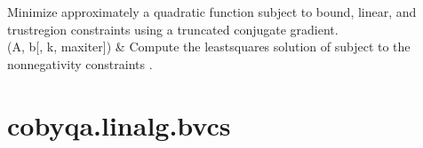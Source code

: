 \documentclass[letterpaper,10pt,english]{sphinxmanual}
\begin{document}
\begin{savenotes}
\begin{longtable}[c]{}
Minimize approximately a quadratic function subject to bound, linear, and trust\sphinxhyphen{}region constraints using a truncated conjugate gradient.
\\
\hline
\sphinxAtStartPar
{\hyperref[\detokenize{refs/generated/cobyqa.linalg.nnls:cobyqa.linalg.nnls}]{}}(A, b{[}, k, maxiter{]})
&
\sphinxAtStartPar
Compute the least\sphinxhyphen{}squares solution of  subject to the nonnegativity constraints .
\\
\hline
\end{longtable}\sphinxatlongtableend\end{savenotes}


\section{cobyqa.linalg.bvcs}
\label{\detokenize{refs/generated/cobyqa.linalg.bvcs:cobyqa-linalg-bvcs}}\label{\detokenize{refs/generated/cobyqa.linalg.bvcs::doc}}
\end{document}
